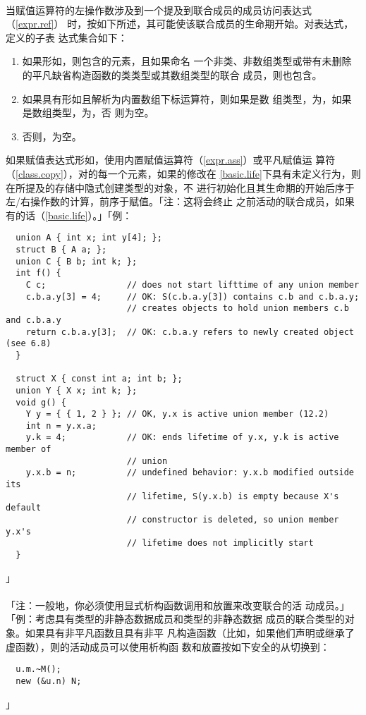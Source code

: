 \paragraph{}
当赋值运算符的左操作数涉及到一个提及到联合成员的成员访问表达式（\ref{expr.ref}）
时，按如下所述，其可能使该联合成员的生命期开始。对表达式，定义的子表
达式集合如下：
\begin{enumerate}
  \item{如果形如，则包含的元素，且如果命名
    一个非类、非数组类型或带有未删除的平凡缺省构造函数的类类型或其数组类型的联合
    成员，则也包含。}
  \item{如果具有形如且解析为内置数组下标运算符，则如果是数
    组类型，为，如果是数组类型，为，否
    则为空。}
  \item{否则，为空。}
\end{enumerate}
如果赋值表达式形如，使用内置赋值运算符（\ref{expr.ass}）或平凡赋值运
算符（\ref{class.copy}），对的每一个元素，如果的修改在
\ref{basic.life}下具有未定义行为，则在所提及的存储中隐式创建类型的对象，不
进行初始化且其生命期的开始后序于左/右操作数的计算，前序于赋值。「注：这将会终止
之前活动的联合成员，如果有的话（\ref{basic.life}）。」「例：
\begin{lstlisting}
  union A { int x; int y[4]; };
  struct B { A a; };
  union C { B b; int k; };
  int f() {
    C c;                // does not start lifttime of any union member
    c.b.a.y[3] = 4;     // OK: S(c.b.a.y[3]) contains c.b and c.b.a.y;
                        // creates objects to hold union members c.b and c.b.a.y
    return c.b.a.y[3];  // OK: c.b.a.y refers to newly created object (see 6.8)
  }

  struct X { const int a; int b; };
  union Y { X x; int k; };
  void g() {
    Y y = { { 1, 2 } }; // OK, y.x is active union member (12.2)
    int n = y.x.a;
    y.k = 4;            // OK: ends lifetime of y.x, y.k is active member of
                        // union
    y.x.b = n;          // undefined behavior: y.x.b modified outside its
                        // lifetime, S(y.x.b) is empty because X's default
                        // constructor is deleted, so union member y.x's
                        // lifetime does not implicitly start
  }
\end{lstlisting}」

\paragraph{}
「注：一般地，你必须使用显式析构函数调用和放置来改变联合的活
动成员。」「例：考虑具有类型的非静态数据成员和类型的非静态数据
成员的联合类型的对象。如果具有非平凡函数且具有非平
凡构造函数（比如，如果他们声明或继承了虚函数），则的活动成员可以使用析构函
数和放置按如下安全的从切换到：
\begin{lstlisting}
  u.m.~M();
  new (&u.n) N;
\end{lstlisting}」

